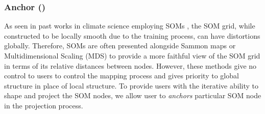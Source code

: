 

\subsubsection{Anchor ()}
As seen in past works in climate science employing SOMs \cite{sheridan_self-organizing_2011}, the SOM grid, while constructed to be locally smooth due to the training process, can have distortions globally. 
%
Therefore, SOMs are often presented alongside Sammon maps or Multidimensional Scaling (MDS) to provide a more faithful view of the SOM grid in terms of its relative distances between nodes.
%
However, these methods give no control to users to control the mapping process and gives priority to global structure in place of local structure.
%
To provide users with the iterative ability to shape and project the SOM nodes, we allow user to \textit{anchors} particular SOM node in the projection process.
% 
%


